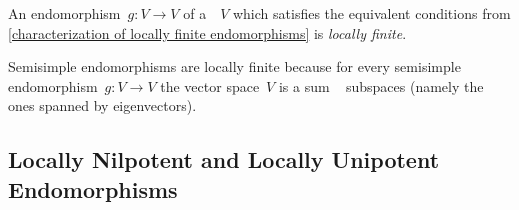 \begin{definition}
  An endomorphism~$g \colon V \to V$ of a~{\kvs}~$V$ which satisfies the equivalent conditions from \cref{characterization of locally finite endomorphisms} is \emph{locally finite}.
\end{definition}


% 
% 
%   
% 
% 
% 
% 


\begin{example}
  Semisimple endomorphisms are locally finite because for every semisimple endomorphism~$g \colon V \to V$ the vector space~$V$ is a sum ~ subspaces (namely the ones spanned by eigenvectors).
\end{example}





\subsection{Locally Nilpotent and Locally Unipotent Endomorphisms}


